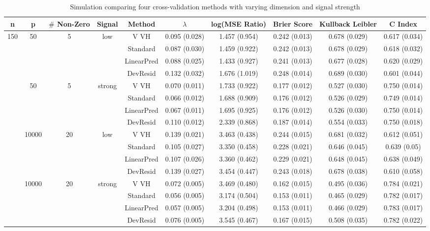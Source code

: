 \begin{table}[htb]

\setlength{\tabcolsep}{3pt}

\caption{\label{Tab:sim} Simulation comparing four cross-validation methods with varying dimension and signal strength}
\centering
\begin{tabular}[t]{cccccccccc}
\toprule
 n& p& $\#$ Non-Zero & Signal & Method & $\lambda$ & log(MSE Ratio) &Brier Score & Kullback Leibler & C Index\\
\midrule
150 & 50 & 5 & low & V VH  & 0.095 (0.028) & 1.457 (0.954) & 0.242 (0.013) & 0.678 (0.029) & 0.617 (0.034) \\
    &    &   &     & Standard  & 0.087 (0.030) & 1.459 (0.922) & 0.242 (0.013) & 0.678 (0.029) & 0.618 (0.032) \\
    &    &   &     & LinearPred  & 0.088 (0.025) & 1.433 (0.927) & 0.241 (0.013) & 0.677 (0.028) & 0.620 (0.029) \\
    &    &   &     & DevResid  & 0.132 (0.032) & 1.676 (1.019) & 0.248 (0.014) & 0.689 (0.030) & 0.601 (0.044) \\
\addlinespace
150 & 50 & 5 & strong & V VH  & 0.070 (0.011) & 1.733 (0.922) & 0.177 (0.012) & 0.527 (0.030) & 0.750 (0.014) \\
    &    &   &     & Standard  & 0.066 (0.012) & 1.688 (0.909) & 0.176 (0.012) & 0.526 (0.029) & 0.749 (0.014) \\
    &    &   &     & LinearPred  & 0.067 (0.011) & 1.695 (0.925) & 0.176 (0.012) & 0.526 (0.030) & 0.750 (0.014) \\
    &    &   &     & DevResid  & 0.110 (0.012) & 2.339 (0.868) & 0.187 (0.014) & 0.554 (0.033) & 0.750 (0.018) \\
\addlinespace
300 & 10000 & 20 & low & V VH  & 0.139 (0.021) & 3.463 (0.438) & 0.244 (0.015) & 0.681 (0.032) & 0.612 (0.051) \\
    &    &   &     & Standard  & 0.105 (0.027) & 3.350 (0.458) & 0.228 (0.021) & 0.646 (0.045) & 0.639 (0.05) \\
    &    &   &     & LinearPred  & 0.107 (0.026) & 3.360 (0.462) & 0.229 (0.021) & 0.648 (0.045) & 0.638 (0.049) \\
    &    &   &     & DevResid  & 0.139 (0.027) & 3.454 (0.447) & 0.243 (0.018) & 0.678 (0.038) & 0.610 (0.058) \\
\addlinespace
500 & 10000 & 20 & strong & V VH  & 0.072 (0.005) & 3.469 (0.480) & 0.162 (0.015) & 0.495 (0.036) & 0.784 (0.021) \\
    &    &   &     & Standard  & 0.056 (0.005) & 3.174 (0.504) & 0.153 (0.011) & 0.465 (0.029) & 0.782 (0.017) \\
    &    &   &     & LinearPred  & 0.057 (0.005) & 3.204 (0.498) & 0.153 (0.011) & 0.466 (0.029) & 0.783 (0.017) \\
    &    &   &     & DevResid  & 0.076 (0.005) & 3.545 (0.467) & 0.167 (0.015) & 0.508 (0.035) & 0.782 (0.022) \\
\bottomrule
\end{tabular}
\end{table}

